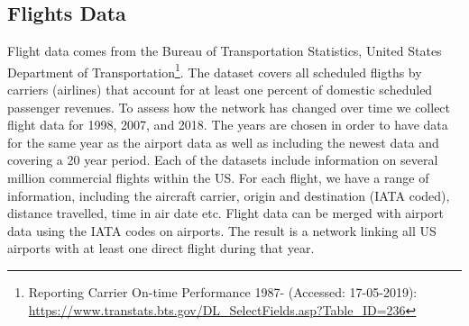 
\subsection{Flights Data}
\label{subsec:Flight_Data}
Flight data comes from the Bureau of Transportation Statistics, United States Department of Transportation\footnote{Reporting Carrier On-time Performance 1987- (Accessed: 17-05-2019): \url{https://www.transtats.bts.gov/DL_SelectFields.asp?Table_ID=236}}. The dataset covers all scheduled fligths by carriers (airlines) that account for at least one percent of domestic scheduled passenger revenues. To assess how the network has changed over time we collect flight data for 1998, 2007, and 2018. The years are chosen in order to have data for the same year as the airport data as well as including the newest data and covering a 20 year period. Each of the datasets include information on several million commercial flights within the US. For each flight, we have a range of information, including the aircraft carrier, origin and destination (IATA coded), distance travelled, time in air date etc. Flight data can be merged with airport data using the IATA codes on airports. The result is a network linking all US airports with at least one direct flight during that year.

